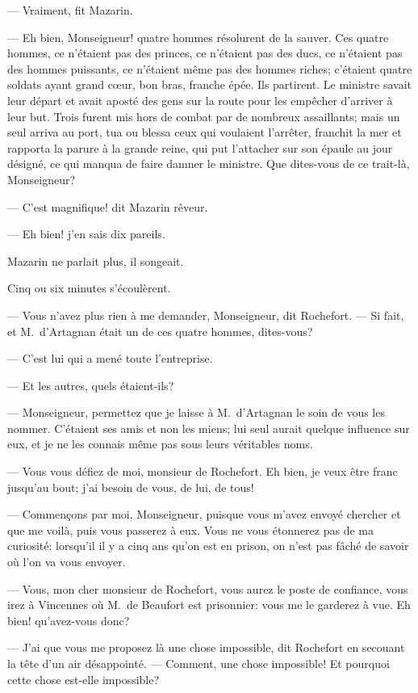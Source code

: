 — Vraiment, fit Mazarin.

— Eh bien, Monseigneur! quatre hommes résolurent de la sauver. Ces quatre hommes, ce n'étaient pas des princes, ce n'étaient pas des ducs, ce n'étaient pas des hommes puissants, ce n'étaient même pas des hommes riches; c'étaient quatre soldats ayant grand cœur, bon bras, franche épée. Ils partirent. Le ministre savait leur départ et avait aposté des gens sur la route pour les empêcher d'arriver à leur but. Trois furent mis hors de combat par de nombreux assaillants; mais un seul arriva au port, tua ou blessa ceux qui voulaient l'arrêter, franchit la mer et rapporta la parure à la grande reine, qui put l'attacher sur son épaule au jour désigné, ce qui manqua de faire damner le ministre. Que dites-vous de ce trait-là, Monseigneur?

— C'est magnifique! dit Mazarin rêveur.

— Eh bien! j'en sais dix pareils.

Mazarin ne parlait plus, il songeait.

Cinq ou six minutes s'écoulèrent.

— Vous n'avez plus rien à me demander, Monseigneur, dit Rochefort.
— Si fait, et M.~d'Artagnan était un de ces quatre hommes, dites-vous?

— C'est lui qui a mené toute l'entreprise.

— Et les autres, quels étaient-ils?

— Monseigneur, permettez que je laisse à M.~d'Artagnan le soin de vous les nommer. C'étaient ses amis et non les miens; lui seul aurait quelque influence sur eux, et je ne les connais même pas sous leurs véritables noms.

— Vous vous défiez de moi, monsieur de Rochefort. Eh bien, je veux être franc jusqu'au bout; j'ai besoin de vous, de lui, de tous!

— Commençons par moi, Monseigneur, puisque vous m'avez envoyé chercher et que me voilà, puis vous passerez à eux. Vous ne vous étonnerez pas de ma curiosité: lorsqu'il il y a cinq ans qu'on est en prison, on n'est pas fâché de savoir où l'on va vous envoyer.

— Vous, mon cher monsieur de Rochefort, vous aurez le poste de confiance, vous irez à Vincennes où M.~de Beaufort est prisonnier: vous me le garderez à vue. Eh bien! qu'avez-vous donc?

— J'ai que vous me proposez là une chose impossible, dit Rochefort en secouant la tête d'un air désappointé.
— Comment, une chose impossible! Et pourquoi cette chose est-elle impossible?


